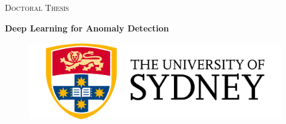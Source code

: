 %
%



\begin{titlepage}
\begin{center}

\vspace*{.06\textheight}
\textsc{\LARGE Doctoral Thesis}\\[0.5cm] %

\HRule %

{\Huge \bfseries Deep Learning for Anomaly Detection \par}\vspace{0.4cm} %
\HRule %


\begin{figure}[H]
\centering
\includegraphics[width=11cm, height=3.4cm]{FIGURES/usyd_logo}
\end{figure}




\end{center}
\end{titlepage}
